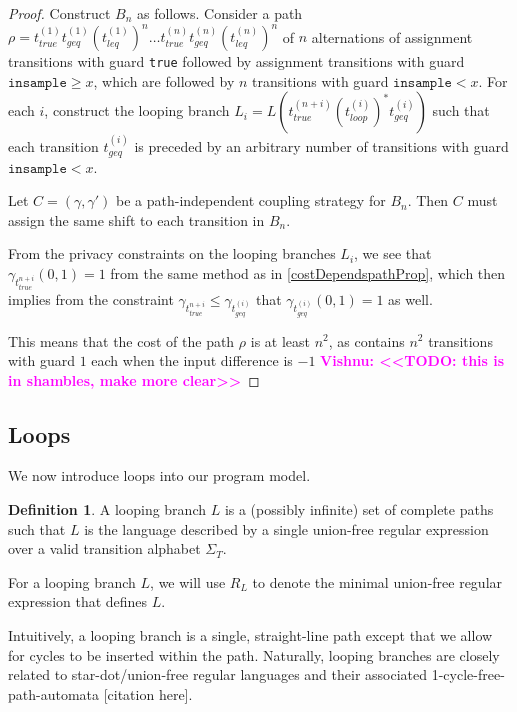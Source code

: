 \documentclass[12pt]{article}
\newcommand{\gguard}[1][x]{\texttt{insample}\geq#1}
\newcommand{\lguard}[1][x]{\texttt{insample} < #1}
\newcommand{\todo}[2]{\textcolor{#1}{\textbf{#2}}}
\newcommand{\vishnu}[1]{\todo{magenta}{Vishnu: <<#1>>}}
\theoremstyle{definition}
\newtheorem{defn}[thm]{Definition}
\begin{document}
\begin{proof}
    Construct $B_n$ as follows. Consider a path $\rho = t_{true}^{(1)} t_{geq}^{(1)} \left(t_{leq}^{(1)}\right)^n \dots t_{true}^{(n)} t_{geq}^{(n)} \left(t_{leq}^{(n)}\right)^n$ of $n$ alternations of assignment transitions with guard \texttt{true} followed by assignment transitions with guard $\gguard$, which are followed by $n$ transitions with guard $\lguard$. For each $i$, construct the looping branch $L_i = L\left(t_{true}^{(n + i)} \left(t_{loop}^{(i)}\right)^* t_{geq}^{(i)}\right)$ such that each transition $t_{geq}^{(i)}$ is preceded by an arbitrary number of transitions with guard $\lguard$.
    
    Let $C = (\gamma, \gamma')$ be a path-independent coupling strategy for $B_n$. Then $C$ must assign the same shift to each transition in $B_n$. 

    From the privacy constraints on the looping branches $L_i$, we see that $\gamma_{t_{true}^{n + i}}(0, 1) = 1$ from the same method as in \ref{costDependspathProp}, which then implies from the constraint $\gamma_{t_{true}^{n + i}} \leq \gamma_{t_{geq}^{(i)}}$ that $\gamma_{t_{geq}^{(i)}}(0, 1) = 1$ as well.

    This means that the cost of the path $\rho$ is at least $n^2$, as contains $n^2$ transitions with guard $1$ each when the input difference is $-1$ \vishnu{TODO: this is in shambles, make more clear}
\end{proof}


\subsection{Loops}

We now introduce loops into our program model. 

\begin{defn}
    A looping branch $L$ is a (possibly infinite) set of complete paths such that $L$ is the language described by a single union-free regular expression over a valid transition alphabet $\Sigma_T$.
\end{defn}

For a looping branch $L$, we will use $R_L$ to denote the minimal union-free regular expression that defines $L$. 

Intuitively, a looping branch is a single, straight-line path except that we allow for cycles to be inserted within the path. Naturally, looping branches are closely related to star-dot/union-free regular languages and their associated 1-cycle-free-path-automata [citation here].
\end{document}
